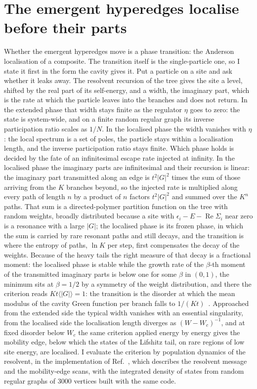 \documentclass[aps,pre,twocolumn,superscriptaddress,floatfix]{revtex4-2}
\newcommand{\eps}{\epsilon}
\begin{document}
\section{The emergent hyperedges localise before their parts}
\label{sec:loc}
Whether the emergent hyperedges move is a phase transition: the
Anderson localisation of a composite.
The transition itself is the single-particle one, so I state it first
in the form the cavity gives it. Put a particle on a site and ask
whether it leaks away. The resolvent recursion of the tree gives the
site a level, shifted by the real part of its self-energy, and a width,
the imaginary part, which is the rate at which the particle leaves into
the branches and does not return. In the extended phase that width stays
finite as the regulator $\eta$ goes to zero: the state is system-wide,
and on a finite random regular graph its inverse participation ratio
scales as $1/N$. In the localised phase the width vanishes with $\eta$:
the local spectrum is a set of poles, the particle stays within a
localisation length, and the inverse participation ratio stays finite.
Which phase holds is decided by the fate of an infinitesimal escape rate
injected at infinity. In the localised phase the imaginary parts are
infinitesimal and their recursion is linear: the imaginary part
transmitted along an edge is $t^{2}|G|^{2}$ times the sum of those
arriving from the $K$ branches beyond, so the injected rate is
multiplied along every path of length $n$ by a product of $n$ factors
$t^{2}|G|^{2}$ and summed over the $K^{n}$ paths. That sum is a
directed-polymer partition function on the tree with random weights,
broadly distributed because a site with $\eps_{i}-E-\operatorname{Re}\Sigma_{i}$
near zero is a resonance with a large $|G|$; the localised phase is its
frozen phase, in which the sum is carried by rare resonant paths and
still decays, and the transition is where the entropy of paths, $\ln K$
per step, first compensates the decay of the weights. Because of the
heavy tails the right measure of that decay is a fractional moment: the
localised phase is stable while the growth rate of the $\beta$-th moment
of the transmitted imaginary parts is below one for some $\beta$ in
$(0,1)$, the minimum sits at $\beta=1/2$ by a symmetry of the weight
distribution, and there the criterion reads $Kt\langle|G|\rangle=1$: the
transition is the disorder at which the mean modulus of the cavity Green
function per branch falls to $1/(Kt)$~\cite{abouchacra1973}. Approached
from the extended side the typical width vanishes with an essential
singularity, from the localised side the localisation length diverges as
$(W-W_{c})^{-1}$, and at fixed disorder below $W_{c}$ the same criterion
applied energy by energy gives the mobility edge, below which the states
of the Lifshitz tail, on rare regions of low site energy, are localised.
I evaluate the criterion by population dynamics of the resolvent, in
the implementation of Ref.~\cite{chybook}, which describes the
resolvent message and the mobility-edge scans, with the integrated
density of states from random regular graphs of $3000$ vertices built
with the same code.
\end{document}
